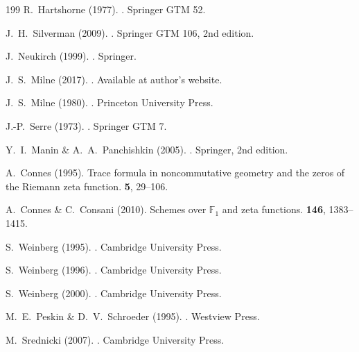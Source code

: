 \documentclass[11pt,a4paper,openright]{book}
\theoremstyle{plain}
\theoremstyle{definition}
\begin{document}
\begin{thebibliography}{199}
R.~Hartshorne (1977).
.
\newblock Springer GTM 52.

J.~H.~Silverman (2009).
.
\newblock Springer GTM 106, 2nd edition.

J.~Neukirch (1999).
.
\newblock Springer.

J.~S.~Milne (2017).
.
\newblock Available at author's website.

J.~S.~Milne (1980).
.
\newblock Princeton University Press.

J.-P.~Serre (1973).
.
\newblock Springer GTM 7.

Y.~I.~Manin \& A.~A.~Panchishkin (2005).
.
\newblock Springer, 2nd edition.

A.~Connes (1995).
\newblock Trace formula in noncommutative geometry and the zeros of the Riemann zeta function.
 {\bf 5}, 29--106.

A.~Connes \& C.~Consani (2010).
\newblock Schemes over $\mathbb{F}_1$ and zeta functions.
 {\bf 146}, 1383--1415.


S.~Weinberg (1995).
.
\newblock Cambridge University Press.

S.~Weinberg (1996).
.
\newblock Cambridge University Press.

S.~Weinberg (2000).
.
\newblock Cambridge University Press.

M.~E.~Peskin \& D.~V.~Schroeder (1995).
.
\newblock Westview Press.

M.~Srednicki (2007).
.
\newblock Cambridge University Press.


\end{thebibliography}
\end{document}
